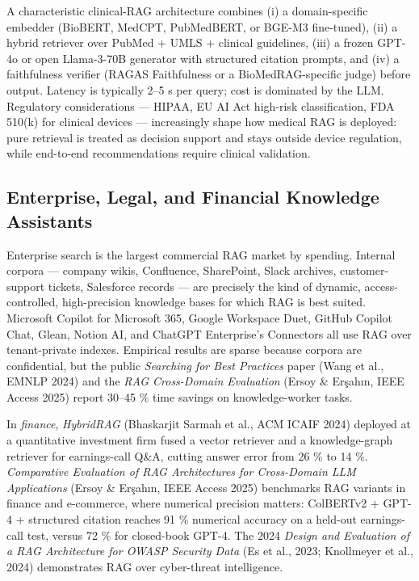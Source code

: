 A characteristic clinical-RAG architecture combines (i) a domain-specific embedder (BioBERT, MedCPT, PubMedBERT, or BGE-M3 fine-tuned), (ii) a hybrid retriever over PubMed + UMLS + clinical guidelines, (iii) a frozen GPT-4o or open Llama-3-70B generator with structured citation prompts, and (iv) a faithfulness verifier (RAGAS Faithfulness or a BioMedRAG-specific judge) before output. Latency is typically 2--5 s per query; cost is dominated by the LLM. Regulatory considerations --- HIPAA, EU AI Act high-risk classification, FDA 510(k) for clinical devices --- increasingly shape how medical RAG is deployed: pure retrieval is treated as decision support and stays outside device regulation, while end-to-end recommendations require clinical validation.

\subsection{Enterprise, Legal, and Financial Knowledge Assistants}\label{enterprise-legal-and-financial-knowledge-assistants}

Enterprise search is the largest commercial RAG market by spending. Internal corpora --- company wikis, Confluence, SharePoint, Slack archives, customer-support tickets, Salesforce records --- are precisely the kind of dynamic, access-controlled, high-precision knowledge bases for which RAG is best suited. Microsoft Copilot for Microsoft 365, Google Workspace Duet, GitHub Copilot Chat, Glean, Notion AI, and ChatGPT Enterprise's Connectors all use RAG over tenant-private indexes. Empirical results are sparse because corpora are confidential, but the public \emph{Searching for Best Practices} paper (Wang et al., EMNLP 2024) and the \emph{RAG Cross-Domain Evaluation} (Ersoy \& Erşahın, IEEE Access 2025) report 30--45 \% time savings on knowledge-worker tasks.

In \emph{finance}, \emph{HybridRAG} (Bhaskarjit Sarmah et al., ACM ICAIF 2024) deployed at a quantitative investment firm fused a vector retriever and a knowledge-graph retriever for earnings-call Q\&A, cutting answer error from 26 \% to 14 \%. \emph{Comparative Evaluation of RAG Architectures for Cross-Domain LLM Applications} (Ersoy \& Erşahın, IEEE Access 2025) benchmarks RAG variants in finance and e-commerce, where numerical precision matters: ColBERTv2 + GPT-4 + structured citation reaches 91 \% numerical accuracy on a held-out earnings-call test, versus 72 \% for closed-book GPT-4. The 2024 \emph{Design and Evaluation of a RAG Architecture for OWASP Security Data} (Es et al., 2023; Knollmeyer et al., 2024) demonstrates RAG over cyber-threat intelligence.

